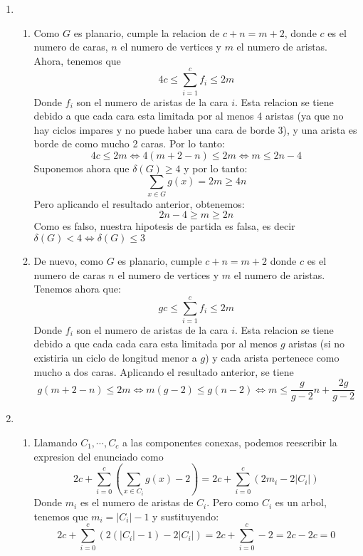 \documentclass{article}
\begin{document}
\begin{enumerate}


\item \begin {enumerate}
\item Como $G$ es planario, cumple la relacion de $c + n = m + 2$, donde $c$ es el numero de caras,
$n$ el numero de vertices y $m$ el numero de aristas. Ahora, tenemos que 
\[
4c \leq \sum_{i = 1}^{c} f_i \leq 2m
\]
Donde $f_i$ son el numero de aristas de la cara $i$. Esta relacion se tiene debido a que cada cara
esta limitada por al menos 4 aristas (ya que no hay ciclos impares y no puede haber una cara de borde
3), y una arista es borde de como mucho 2 caras. Por lo tanto:
\[
4c \leq 2m \iff 4(m + 2 - n) \leq 2m \iff m \leq 2n - 4
\]
Suponemos ahora que $\delta(G) \geq 4$ y por lo tanto:
\[
\sum_{x \in G} g(x) = 2m \geq 4n 
\]
Pero aplicando el resultado anterior, obtenemos:
\[
2n -4 \geq m \geq 2n
\]
Como es falso, nuestra hipotesis de partida es falsa, es decir $\delta(G) < 4 \iff \delta(G) \leq 3$

\item De nuevo, como $G$ es planario, cumple $c + n = m +2$ donde $c$ es el numero de caras
$n$ el numero de vertices y $m$ el numero de aristas. Tenemos ahora que:
\[
gc \leq \sum_{i=1}^{c} f_i \leq 2m
\]
Donde $f_i$ son el numero de aristas de la cara $i$.  Esta relacion se tiene debido a que cada cada cara
esta limitada por al menos $g$ aristas (si no existiria un ciclo de longitud menor a $g$) y cada arista
pertenece como mucho a dos caras. Aplicando el resultado anterior, se tiene
\[
g(m+2-n) \leq 2m \iff m(g-2) \leq g(n-2) \iff m \leq \frac{g}{g-2}n + \frac{2g}{g-2}
\]
\end{enumerate}




\item \begin{enumerate}
\item Llamando $C_1, \cdots, C_c$ a las componentes conexas, podemos reescribir la expresion
del enunciado como
\[
2c + \sum_{i=0}^{c} \left( \sum_{x \in C_i} g(x) - 2 \right) =
2c + \sum_{i=0}^{c} \left( 2 m_i - 2 \lvert C_i \rvert \right)
\]
Donde $m_i$ es el numero de aristas de $C_i$. Pero como $C_i$ es un arbol, tenemos que
$m_i = \lvert C_i \rvert - 1$ y sustituyendo:
\[
2c + \sum_{i=0}^{c} \left(2(\lvert C_i \rvert - 1) - 2 \lvert C_i \rvert \right) = 
2c + \sum_{i=0}^{c} -2 = 2c -2c = 0
\]


\end{enumerate}
\end{enumerate}
\end{document}
